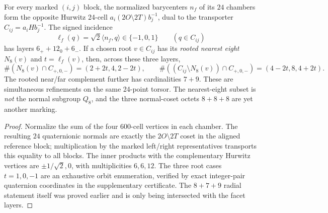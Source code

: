 \documentclass[11pt]{article}
\begin{document}
\begin{theorem}
\label{p1:thm:v366-dual-hurwitz-refinement}
For every marked $(i,j)$ block, the normalized barycenters $n_f$ of
its $24$ chambers form the opposite Hurwitz 24-cell
$a_i(2O\setminus2T)b_j^{-1}$, dual to the transporter
$C_{ij}=a_iHb_j^{-1}$.  The signed incidence
\[
 \ell_f(q)=\sqrt2\langle n_f,q\rangle\in\{-1,0,1\}
 \qquad(q\in C_{ij})
\]
has layers $6_++12_0+6_-$.  If a chosen root $v\in C_{ij}$ has
its \emph{rooted nearest eight} $N_8(v)$ and $t=\ell_f(v)$,
then, across these three layers,
\[
 \#(N_8(v)\cap C_{+,0,-})=(2+2t,4,2-2t),\qquad
 \#((C_{ij}\setminus N_8(v))\cap C_{+,0,-})=(4-2t,8,4+2t).
\]
The rooted near/far complement further has cardinalities $7+9$.
These are simultaneous refinements on the same 24-point torsor.
The nearest-eight subset is \emph{not} the normal subgroup $Q_8$,
and the three normal-coset octets $8+8+8$ are yet another marking.
\end{theorem}
\begin{proof}
Normalize the sum of the four 600-cell vertices in each chamber.
The resulting $24$ quaternionic normals are exactly the $2O\setminus
2T$ coset in the aligned reference block; multiplication by the marked
left/right representatives transports this equality to all blocks.
The inner products with the complementary Hurwitz vertices are
$\pm1/\sqrt2,0$, with multiplicities $6,6,12$.
The three root cases $t=1,0,-1$ are an exhaustive orbit enumeration,
verified by exact integer-pair quaternion coordinates in the
supplementary certificate.  The $8+7+9$ radial statement itself was
proved earlier and is only being intersected with the facet layers.
\end{proof}
\end{document}
